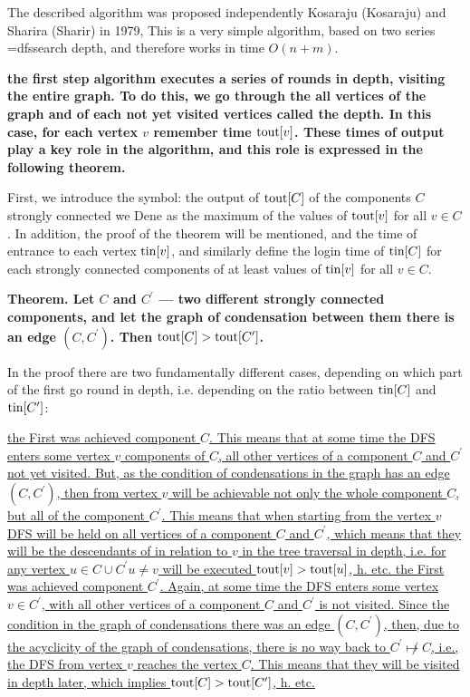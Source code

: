 The described algorithm was proposed independently Kosaraju (Kosaraju) and Sharira (Sharir) in 1979, This is a very simple algorithm, based on two series \algohref=dfs{search depth}, and therefore works in time $O(n+m)$.

\bf{the first step} algorithm executes a series of rounds in depth, visiting the entire graph. To do this, we go through the all vertices of the graph and of each not yet visited vertices called the depth. In this case, for each vertex $v$ remember \bf{time} ${\rm tout}[v]$. These times of output play a key role in the algorithm, and this role is expressed in the following theorem.

First, we introduce the symbol: the output of ${\rm tout}[C]$ of the components $C$ strongly connected we Dene as the maximum of the values of ${\rm tout}[v]$ for all $v \in C$. In addition, the proof of the theorem will be mentioned, and the time of entrance to each vertex ${\rm tin}[v]$, and similarly define the login time of ${\rm tin}[C]$ for each strongly connected components of at least values of ${\rm tin}[v]$ for all $v \in C$.

\bf{Theorem}. Let $C$ and $C^\prime$ --- two different strongly connected components, and let the graph of condensation between them there is an edge $(C,C^\prime)$. Then ${\rm tout}[C] > {\rm tout}[C^\prime]$.

In the proof there are two fundamentally different cases, depending on which part of the first go round in depth, i.e. depending on the ratio between ${\rm tin}[C]$ and ${\rm tin}[C^\prime]$:

\ul{
\li the First was achieved component $C$. This means that at some time the DFS enters some vertex $v$ components of $C$, all other vertices of a component $C$ and $C^\prime$ not yet visited. But, as the condition of condensations in the graph has an edge $(C,C^\prime)$, then from vertex $v$ will be achievable not only the whole component $C$, but all of the component $C^\prime$. This means that when starting from the vertex $v$ DFS will be held on all vertices of a component $C$ and $C^\prime$, which means that they will be the descendants of in relation to $v$ in the tree traversal in depth, i.e. for any vertex $u \in C \cup C^\prime u \ne v$ will be executed ${\rm tout}[v] > {\rm tout}[u]$, h. etc.
\li the First was achieved component $C^\prime$. Again, at some time the DFS enters some vertex $v \in C^\prime$, with all other vertices of a component $C$ and $C^\prime$ is not visited. Since the condition in the graph of condensations there was an edge $(C,C^\prime)$, then, due to the acyclicity of the graph of condensations, there is no way back to $C^\prime \not\mapsto C$, i.e., the DFS from vertex $v$ reaches the vertex $C$. This means that they will be visited in depth later, which implies ${\rm tout}[C] > {\rm tout}[C^\prime]$, h. etc.
}


